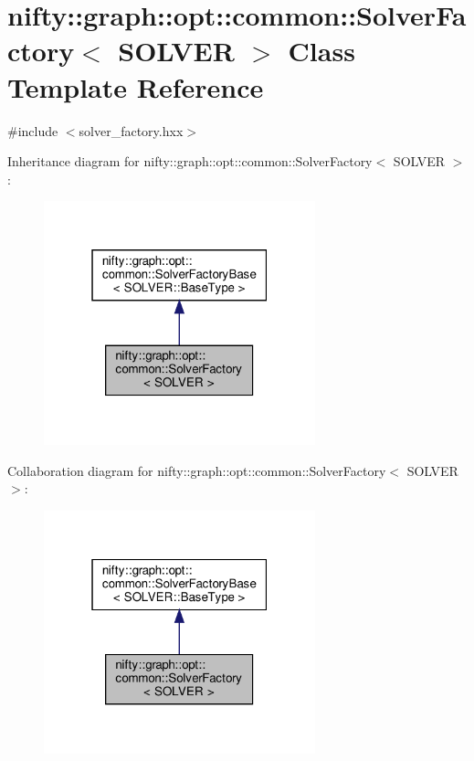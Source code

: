 \hypertarget{classnifty_1_1graph_1_1opt_1_1common_1_1SolverFactory}{}\section{nifty\+:\+:graph\+:\+:opt\+:\+:common\+:\+:Solver\+Factory$<$ S\+O\+L\+V\+ER $>$ Class Template Reference}
\label{classnifty_1_1graph_1_1opt_1_1common_1_1SolverFactory}


{\ttfamily \#include $<$solver\+\_\+factory.\+hxx$>$}



Inheritance diagram for nifty\+:\+:graph\+:\+:opt\+:\+:common\+:\+:Solver\+Factory$<$ S\+O\+L\+V\+ER $>$\+:
\nopagebreak
\begin{figure}[H]
\begin{center}
\leavevmode
\includegraphics[width=223pt]{classnifty_1_1graph_1_1opt_1_1common_1_1SolverFactory__inherit__graph}
\end{center}
\end{figure}


Collaboration diagram for nifty\+:\+:graph\+:\+:opt\+:\+:common\+:\+:Solver\+Factory$<$ S\+O\+L\+V\+ER $>$\+:
\nopagebreak
\begin{figure}[H]
\begin{center}
\leavevmode
\includegraphics[width=223pt]{classnifty_1_1graph_1_1opt_1_1common_1_1SolverFactory__coll__graph}
\end{center}
\end{figure}
